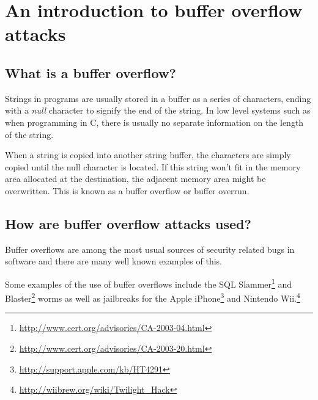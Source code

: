 \section{An introduction to buffer overflow attacks}
\subsection{What is a buffer overflow?}
Strings in programs are usually stored in a buffer as a series of characters,
ending with a \emph{null} character to signify the end of the string.
In low level systems such as when programming in C,
there is usually no separate information on the length of the string.

When a string is copied into another string buffer,
the characters are simply copied until the null character is located.
If this string won't fit in the memory area allocated at the destination,
the adjacent memory area might be overwritten.
This is known as a buffer overflow or buffer overrun.

\subsection{How are buffer overflow attacks used?}
Buffer overflows are among the most usual sources of
security related bugs in software and
there are many well known examples of this.

Some examples of the use of buffer overflows include the
SQL Slammer\footnote{\url{http://www.cert.org/advisories/CA-2003-04.html}}
and Blaster\footnote{\url{http://www.cert.org/advisories/CA-2003-20.html}}
worms as well as jailbreaks
for the Apple iPhone\footnote{\url{http://support.apple.com/kb/HT4291}}
and Nintendo Wii.\footnote{\url{http://wiibrew.org/wiki/Twilight_Hack}}
